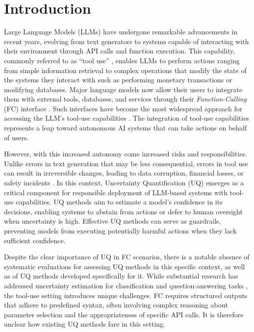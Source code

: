 \section{Introduction}
\label{sec:introduction}

Large Language Models (LLMs) have undergone remarkable advancements in recent years, evolving from text generators to systems capable of interacting with their environment through API calls and function execution. 
This capability, commonly referred to as ``tool use'' \citep{schick2023toolformer, qin2024tooll, mialon2023augmented}, enables LLMs to perform actions ranging from simple information retrieval to complex operations that modify the state of the systems they interact with such as performing monetary transactions or modifying databases.
Major language models \citep{achiam2023gpt, grattafiori2024llama, jiang2024mixtral, team2024gemini} 
now allow their users to integrate them with external tools, databases, and services through their \emph{Function-Calling} (FC) interface \citep{openai2025fc,gemini2025fc}. Such interfaces have become the most widespread approach for accessing the LLM's tool-use capabilities \citep{carrigan2024tool}.
The integration of tool-use capabilities represents a leap toward autonomous AI systems that can take actions on behalf of users. 

However, with this increased autonomy come increased risks and responsibilities. 
Unlike errors in text generation that may be less consequential, errors in tool use can result in irreversible changes, leading to data corruption, financial losses, or safety incidents \citep{andriushchenko2024, aichberger2025attacking}. In this context, Uncertainty Quantification (UQ) emerges as a critical component for responsible deployment of LLM-based systems with tool-use capabilities. 
UQ methods aim to estimate a model's confidence in its decisions,
enabling systems to abstain from actions or defer to human oversight when uncertainty is high. 
Effective UQ methods can serve as guardrails, preventing models from executing potentially harmful actions when they lack sufficient confidence. 

Despite the clear importance of UQ in FC scenarios, there is a notable absence of systematic evaluations for assessing UQ methods in this specific context, as well as of UQ methods developed specifically for it. 
While substantial research has addressed uncertainty estimation for classification and question-answering tasks \citep{kirchhof2024pretrained, kuhn2023semantic, ye2024benchmarking}, the tool-use setting introduces unique challenges. 
FC requires structured outputs that adhere to predefined syntax, often involving complex reasoning about parameter selection and the appropriateness of specific API calls. 
It is therefore unclear how existing UQ methods fare in this setting.


